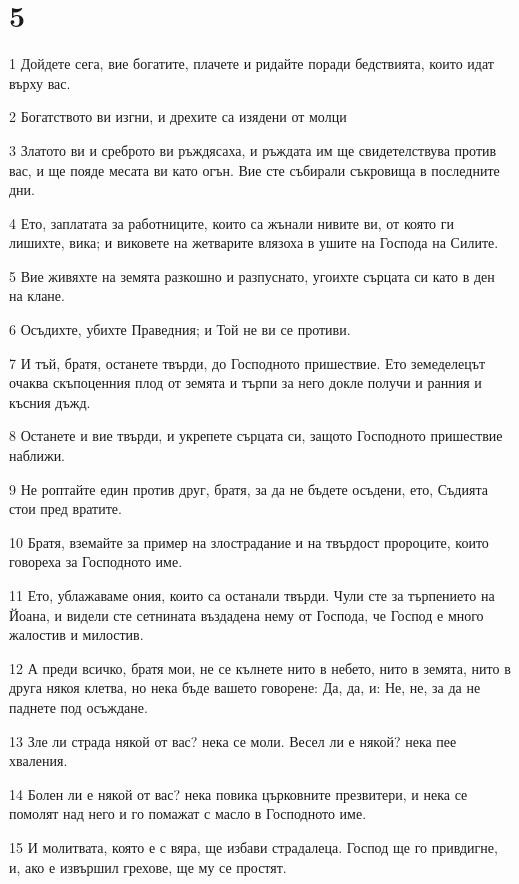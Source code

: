 \chapter{5}

\par 1 Дойдете сега, вие богатите, плачете и ридайте поради бедствията, които идат върху вас.
\par 2 Богатството ви изгни, и дрехите са изядени от молци
\par 3 Златото ви и среброто ви ръждясаха, и ръждата им ще свидетелствува против вас, и ще пояде месата ви като огън. Вие сте събирали съкровища в последните дни.
\par 4 Ето, заплатата за работниците, които са жънали нивите ви, от която ги лишихте, вика; и виковете на жетварите влязоха в ушите на Господа на Силите.
\par 5 Вие живяхте на земята разкошно и разпуснато, угоихте сърцата си като в ден на клане.
\par 6 Осъдихте, убихте Праведния; и Той не ви се противи.
\par 7 И тъй, братя, останете твърди, до Господното пришествие. Ето земеделецът очаква скъпоценния плод от земята и търпи за него докле получи и ранния и късния дъжд.
\par 8 Останете и вие твърди, и укрепете сърцата си, защото Господното пришествие наближи.
\par 9 Не роптайте един против друг, братя, за да не бъдете осъдени, ето, Съдията стои пред вратите.
\par 10 Братя, вземайте за пример на злострадание и на твърдост пророците, които говореха за Господното име.
\par 11 Ето, ублажаваме ония, които са останали твърди. Чули сте за търпението на Йоана, и видели сте сетнината въздадена нему от Господа, че Господ е много жалостив и милостив.
\par 12 А преди всичко, братя мои, не се кълнете нито в небето, нито в земята, нито в друга някоя клетва, но нека бъде вашето говорене: Да, да, и: Не, не, за да не паднете под осъждане.
\par 13 Зле ли страда някой от вас? нека се моли. Весел ли е някой? нека пее хваления.
\par 14 Болен ли е някой от вас? нека повика църковните презвитери, и нека се помолят над него и го помажат с масло в Господното име.
\par 15 И молитвата, която е с вяра, ще избави страдалеца. Господ ще го привдигне, и, ако е извършил грехове, ще му се простят.
